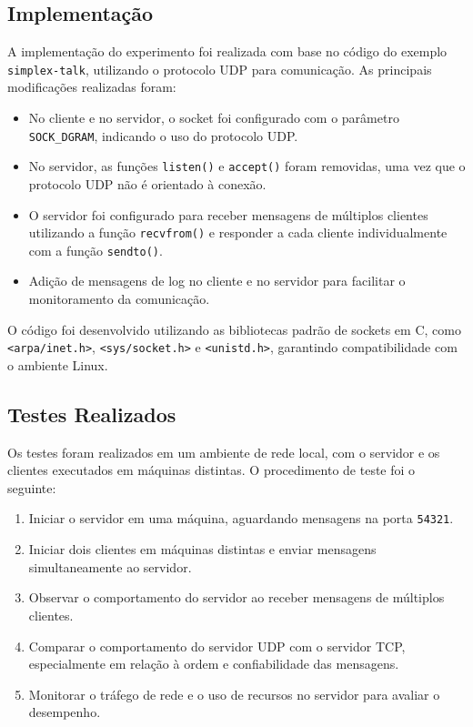 \subsection*{Implementação}

A implementação do experimento foi realizada com base no código do exemplo \texttt{simplex-talk}, utilizando o protocolo UDP para comunicação. As principais modificações realizadas foram:
\begin{itemize}
    \item No cliente e no servidor, o socket foi configurado com o parâmetro \texttt{SOCK\_DGRAM}, indicando o uso do protocolo UDP.
    \item No servidor, as funções \texttt{listen()} e \texttt{accept()} foram removidas, uma vez que o protocolo UDP não é orientado à conexão.
    \item O servidor foi configurado para receber mensagens de múltiplos clientes utilizando a função \texttt{recvfrom()} e responder a cada cliente individualmente com a função \texttt{sendto()}.
    \item Adição de mensagens de log no cliente e no servidor para facilitar o monitoramento da comunicação.
\end{itemize}

O código foi desenvolvido utilizando as bibliotecas padrão de sockets em C, como \texttt{<arpa/inet.h>}, \texttt{<sys/socket.h>} e \texttt{<unistd.h>}, garantindo compatibilidade com o ambiente Linux.

\subsection*{Testes Realizados}

Os testes foram realizados em um ambiente de rede local, com o servidor e os clientes executados em máquinas distintas. O procedimento de teste foi o seguinte:
\begin{enumerate}
    \item Iniciar o servidor em uma máquina, aguardando mensagens na porta \texttt{54321}.
    \item Iniciar dois clientes em máquinas distintas e enviar mensagens simultaneamente ao servidor.
    \item Observar o comportamento do servidor ao receber mensagens de múltiplos clientes.
    \item Comparar o comportamento do servidor UDP com o servidor TCP, especialmente em relação à ordem e confiabilidade das mensagens.
    \item Monitorar o tráfego de rede e o uso de recursos no servidor para avaliar o desempenho.
\end{enumerate}

